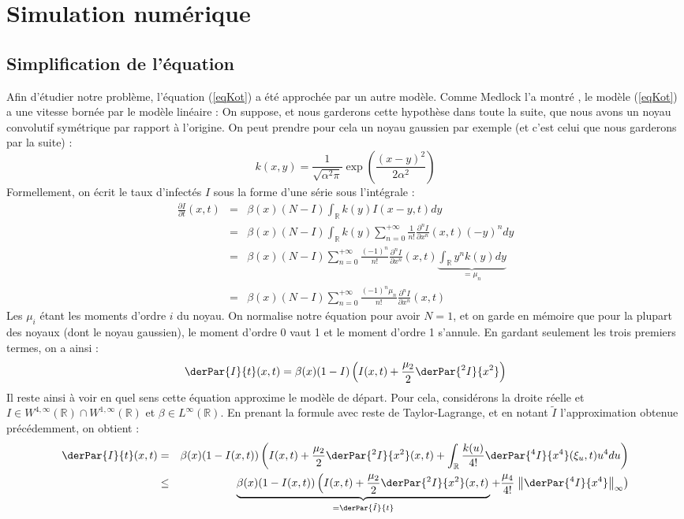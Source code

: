 \documentclass{article}
\begin{document}
\section{Simulation numérique}
\subsection{Simplification de l'équation}
Afin d'étudier notre problème, l'équation (\ref{eqKot}) a été approchée par un autre modèle. Comme Medlock l'a montré \cite{KotMedlock03}, le modèle (\ref{eqKot}) a une vitesse bornée par le modèle linéaire :
On suppose, et nous garderons cette hypothèse dans toute la suite, que nous avons un noyau convolutif symétrique par rapport à l'origine. On peut prendre pour cela un noyau gaussien par exemple (et c'est celui que nous garderons par la suite) :
\[k(x,y)=\frac{1}{\sqrt{\alpha^2\pi}}\exp\left(\frac{(x-y)^2}{2\alpha^2}\right)\]
Formellement, on écrit le taux d'infectés $I$ sous la forme d'une série sous l'intégrale :
\begin{eqnarray*}
\frac{\partial I}{\partial t}(x,t) &=& \beta(x)(N-I)\int_{\mathbb{R}} k(y)I(x-y,t)dy\\
				&=&\beta(x)(N-I)\int_{\mathbb{R}} k(y)\sum_{n=0}^{+\infty} \frac{1}{n!} \frac{\partial^n I}{\partial x^n}(x,t)(-y)^n dy\\
				&=&\beta(x)(N-I)\sum_{n=0}^{+\infty} \frac{(-1)^n}{n!} \frac{\partial^n I}{\partial x^n}(x,t) \underbrace{\int_{\mathbb{R}} y^n k(y) dy}_{=\mu_n}\\
				&=&\beta(x)(N-I)\sum_{n=0}^{+\infty} \frac{(-1)^n\mu_n}{n!} \frac{\partial^n I}{\partial x^n}(x,t)
\end{eqnarray*}
Les $\mu_i$ étant les moments d'ordre $i$ du noyau. On normalise notre équation pour avoir $N=1$, et on garde en mémoire que pour la plupart des noyaux (dont le noyau gaussien), le moment d'ordre 0 vaut 1 et le moment d'ordre 1 s'annule. En gardant seulement les trois premiers termes, on a ainsi :
\begin{equation}\label{approx}
	\derPar{I}{t}(x,t)=\beta(x)(1-I)\left(I(x,t)+\frac{\mu_2}{2}\derPar{{}^2I}{x^2}\right)
\end{equation}
Il reste ainsi à voir en quel sens cette équation approxime le modèle de départ. Pour cela, considérons la droite réelle et $I\in W^{4,\infty}(\mathbb{R})\cap W^{1,\infty}(\mathbb{R})$ et $\beta\in L^\infty(\mathbb{R})$. En prenant la formule avec reste de Taylor-Lagrange, et en notant $\tilde{I}$ l'approximation obtenue précédemment, on obtient :
\begin{eqnarray*}
	\derPar{I}{t}(x,t)&=&\beta(x)(1-I(x,t))\left( I(x,t)+\frac{\mu_2}{2}\derPar{{}^2I}{x^2}(x,t)+\int_{\mathbb{R}}\frac{k(u)}{4!} \derPar{{}^4I}{x^4}(\xi_u,t)u^4 du \right)\\
			&\leq&\underbrace{\beta(x)(1-I(x,t))\left( I(x,t)+\frac{\mu_2}{2}\derPar{{}^2I}{x^2}(x,t)\right.}_{=\derPar{\tilde{I}}{t}}+\frac{\mu_4}{4!} \left. \left\|\derPar{{}^4I}{x^4}\right\|_{\infty} \right)\\
\end{eqnarray*}
\end{document}
